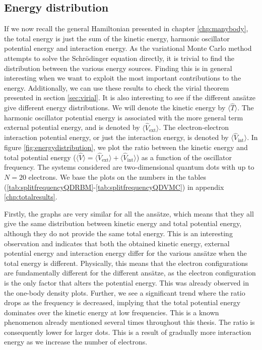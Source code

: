 \subsection{Energy distribution} \label{sec:energydistributions}
If we now recall the general Hamiltonian presented in chapter \ref{chp:manybody}, the total energy is just the sum of the kinetic energy, harmonic oscillator potential energy and interaction energy. As the variational Monte Carlo method attempts to solve the Schrödinger equation directly, it is trivial to find the distribution between the various energy sources. Finding this is in general interesting when we want to exploit the most important contributions to the energy. Additionally, we can use these results to check the virial theorem presented in section \ref{sec:virial}. It is also interesting to see if the different ansätze give different energy distributions. We will denote the kinetic energy by $\langle\hat{T}\rangle$. The harmonic oscillator potential energy is associated with the more general term external potential energy, and is denoted by $\langle\hat{V}_{\text{ext}}\rangle$. The electron-electron interaction potential energy, or just the interaction energy, is denoted by $\langle\hat{V}_{\text{int}}\rangle$. In figure \eqref{fig:energydistribution}, we plot the ratio between the kinetic energy and total potential energy ($\langle\hat{V}\rangle=\langle\hat{V}_{\text{ext}}\rangle+\langle\hat{V}_{\text{int}}\rangle$) as a function of the oscillator frequency. The systems considered are two-dimensional quantum dots with up to $N=20$ electrons. We base the plots on the numbers in the tables (\ref{tab:splitfrequencyQDRBM}-\ref{tab:splitfrequencyQDVMC}) in appendix \ref{chp:totalresults}.



Firstly, the graphs are very similar for all the ansätze, which means that they all give the same distribution between kinetic energy and total potential energy, although they do not provide the same total energy. This is an interesting observation and indicates that both the obtained kinetic energy, external potential energy and interaction energy differ for the various ansätze when the total energy is different. Physically, this means that the electron configurations are fundamentally different for the different ansätze, as the electron configuration is the only factor that alters the potential energy. This was already observed in the one-body density plots. Further, we see a significant trend where the ratio drops as the frequency is decreased, implying that the total potential energy dominates over the kinetic energy at low frequencies. This is a known phenomenon already mentioned several times throughout this thesis. The ratio is consequently lower for larger dots. This is a result of gradually more interaction energy as we increase the number of electrons. 


